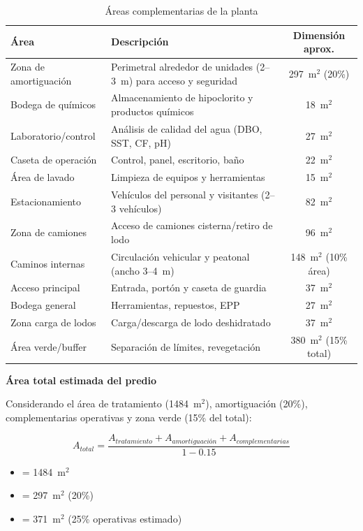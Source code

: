 \documentclass[12pt,a4paper]{article}
\begin{document}
\begin{table}[H]
\centering
\caption{Áreas complementarias de la planta}
\small
\begin{tabular}{lp{8cm}c}
\toprule
Área & Descripción & Dimensión aprox. \\
\midrule
Zona de amortiguación & Perimetral alrededor de unidades (2--3~m) para acceso y seguridad & 297~m$^2$ (20\%) \\
\addlinespace
Bodega de químicos & Almacenamiento de hipoclorito y productos químicos & 18~m$^2$ \\
\addlinespace
Laboratorio/control & Análisis de calidad del agua (DBO, SST, CF, pH) & 27~m$^2$ \\
\addlinespace
Caseta de operación & Control, panel, escritorio, baño & 22~m$^2$ \\
\addlinespace
Área de lavado & Limpieza de equipos y herramientas & 15~m$^2$ \\
\addlinespace
Estacionamiento & Vehículos del personal y visitantes (2--3 vehículos) & 82~m$^2$ \\
\addlinespace
Zona de camiones & Acceso de camiones cisterna/retiro de lodo & 96~m$^2$ \\
\addlinespace
Caminos internas & Circulación vehicular y peatonal (ancho 3--4~m) & 148~m$^2$ (10\% área) \\
\addlinespace
Acceso principal & Entrada, portón y caseta de guardia & 37~m$^2$ \\
\addlinespace
Bodega general & Herramientas, repuestos, EPP & 27~m$^2$ \\
\addlinespace
Zona carga de lodos & Carga/descarga de lodo deshidratado & 37~m$^2$ \\
\addlinespace
Área verde/buffer & Separación de límites, revegetación & 380~m$^2$ (15\% total) \\
\bottomrule
\end{tabular}
\end{table}

\textbf{Área total estimada del predio}

Considerando el área de tratamiento (1484~m$^2$), amortiguación (20\%), complementarias operativas y zona verde (15\% del total):

\begin{equation}
A_{total} = \frac{A_{tratamiento} + A_{amortiguación} + A_{complementarias}}{1 - 0.15}
\end{equation}

\begin{itemize}[noitemsep,leftmargin=2em]
    \item[$A_{tratamiento}$] = 1484~m$^2$
    \item[$A_{amortiguación}$] = 297~m$^2$ (20\%)
    \item[$A_{complementarias}$] = 371~m$^2$ (25\% operativas estimado)
\end{itemize}
\end{document}
